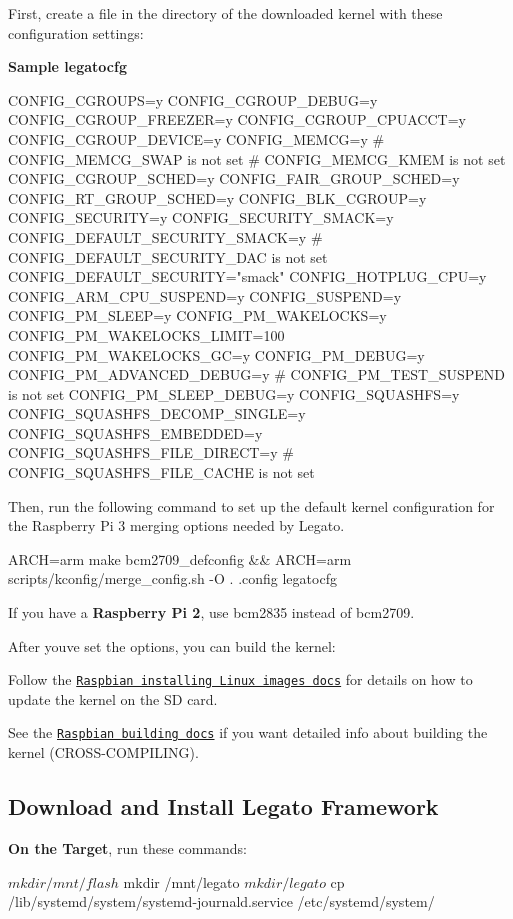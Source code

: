 First, create a file in the directory of the downloaded kernel with these configuration settings\+:

{\bfseries Sample {\ttfamily legatocfg}} 


\begin{DoxyCode}
CONFIG\_CGROUPS=y
CONFIG\_CGROUP\_DEBUG=y
CONFIG\_CGROUP\_FREEZER=y
CONFIG\_CGROUP\_CPUACCT=y
CONFIG\_CGROUP\_DEVICE=y
CONFIG\_MEMCG=y
\textcolor{preprocessor}{# CONFIG\_MEMCG\_SWAP is not set}
\textcolor{preprocessor}{# CONFIG\_MEMCG\_KMEM is not set}
CONFIG\_CGROUP\_SCHED=y
CONFIG\_FAIR\_GROUP\_SCHED=y
CONFIG\_RT\_GROUP\_SCHED=y
CONFIG\_BLK\_CGROUP=y
CONFIG\_SECURITY=y
CONFIG\_SECURITY\_SMACK=y
CONFIG\_DEFAULT\_SECURITY\_SMACK=y
\textcolor{preprocessor}{# CONFIG\_DEFAULT\_SECURITY\_DAC is not set}
CONFIG\_DEFAULT\_SECURITY=\textcolor{stringliteral}{"smack"}
CONFIG\_HOTPLUG\_CPU=y
CONFIG\_ARM\_CPU\_SUSPEND=y
CONFIG\_SUSPEND=y
CONFIG\_PM\_SLEEP=y
CONFIG\_PM\_WAKELOCKS=y
CONFIG\_PM\_WAKELOCKS\_LIMIT=100
CONFIG\_PM\_WAKELOCKS\_GC=y
CONFIG\_PM\_DEBUG=y
CONFIG\_PM\_ADVANCED\_DEBUG=y
\textcolor{preprocessor}{# CONFIG\_PM\_TEST\_SUSPEND is not set}
CONFIG\_PM\_SLEEP\_DEBUG=y
CONFIG\_SQUASHFS=y
CONFIG\_SQUASHFS\_DECOMP\_SINGLE=y
CONFIG\_SQUASHFS\_EMBEDDED=y
CONFIG\_SQUASHFS\_FILE\_DIRECT=y
\textcolor{preprocessor}{# CONFIG\_SQUASHFS\_FILE\_CACHE is not set}
\end{DoxyCode}


Then, run the following command to set up the default kernel configuration for the Raspberry Pi 3 merging options needed by Legato. 
\begin{DoxyCode}
ARCH=arm make bcm2709\_defconfig && ARCH=arm scripts/kconfig/merge\_config.sh -O . .config legatocfg
\end{DoxyCode}


If you have a {\bfseries Raspberry Pi 2}, use {\ttfamily bcm2835} instead of {\ttfamily bcm2709}.

After you\textquotesingle{}ve set the options, you can build the kernel\+: 


Follow the \href{https://www.raspberrypi.org/documentation/installation/installing-images/linux.md}{\tt Raspbian installing Linux images docs} for details on how to update the kernel on the SD card.

See the \href{https://www.raspberrypi.org/documentation/linux/kernel/building.md}{\tt Raspbian building docs} if you want detailed info about building the kernel (C\+R\+O\+S\+S-\/\+C\+O\+M\+P\+I\+L\+I\+NG).\hypertarget{raspbianMain_raspbianMain_installLegato}{}\subsection{Download and Install Legato Framework}\label{raspbianMain_raspbianMain_installLegato}
{\bfseries On the Target}, run these commands\+: 
\begin{DoxyCode}
$ mkdir /mnt/flash
$ mkdir /mnt/legato
$ mkdir /legato
$ cp /lib/systemd/system/systemd-journald.service /etc/systemd/system/
\end{DoxyCode}


